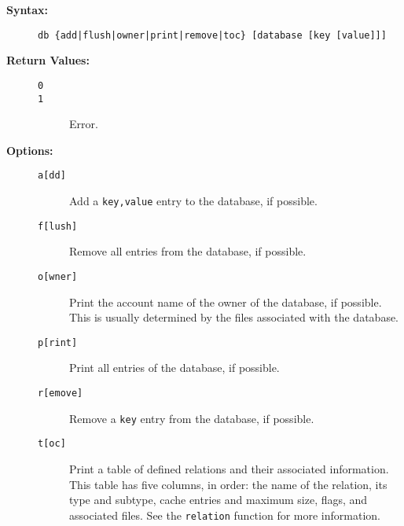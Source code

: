 \begin{description}
\item[{\bf Syntax:}] \mbox{}

{\tt db \{add\verb/|/flush\verb/|/owner\verb/|/print\verb/|/remove\verb/|/toc\} {[database [key [value]]]}}



\item[{\bf Return Values:}] \mbox{}

\begin{description}
\item[{\tt 0}] \mbox{}



\item[{\tt 1}] \mbox{}

Error.

\end{description}


\item[{\bf Options:}] \mbox{}

\begin{description}
\item[{\tt {a[dd]}}] \mbox{}

Add a {\tt key,value} 
entry to the database, if possible.

\item[{\tt {f[lush]}}] \mbox{}

Remove all entries from the database, 
if possible.

\item[{\tt {o[wner]}}] \mbox{}

Print the account name of the owner 
of the database, if possible. This is usually determined by the 
files associated with the database.

\item[{\tt {p[rint]}}] \mbox{}

Print all entries of the database, 
if possible. 

\item[{\tt {r[emove]}}] \mbox{}

Remove a {\tt key} entry 
from the database, if possible.

\item[{\tt {t[oc]}}] \mbox{}

Print a table of defined relations 
and their associated information. This table has five columns, 
in order: the name of the relation, its type and subtype, cache 
entries and maximum size, flags, and associated files. See the 
{\tt relation} function for more information.


\end{description}
\end{description}
